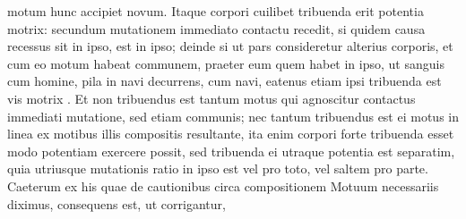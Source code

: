 %
motum hunc accipiet novum. 
\pend
%
\pstart
Itaque corpori cuilibet tribuenda erit potentia motrix\lbrack:\rbrack\protect{}
%
%
secundum mutationem
%
%
immediato contactu\protect{} recedit, si quidem causa recessus%
\protect{} sit in ipso,
%
%
est in ipso; deinde 
%
si ut pars consideretur alterius corporis, et cum eo motum habeat communem, praeter eum quem habet in ipso, 
%
ut sanguis\protect{} cum homine\protect{}, 
%
pila\protect{} in navi\protect{} decurrens,
%
cum navi\protect{}, 
%
eatenus etiam ipsi tribuenda est vis motrix%
\protect{}
%
. Et 
%
%
non tribuendus est tantum motus qui agnoscitur contactus immediati%
\protect{} mutatione, 
%
sed etiam communis; nec tantum tribuendus est ei motus in linea ex motibus illis compositis resultante, 
%
ita enim corpori forte tribuenda esset 
%
%
modo potentiam\protect{} exercere possit, sed tribuenda ei utraque 
%
potentia\protect{} est separatim, quia utriusque
%
 mutationis ratio in ipso est vel pro toto, vel saltem pro parte.
\pend
%
\pstart
Caeterum ex his
%
quae de cautionibus circa compositionem Motuum%
\protect{} necessariis diximus, consequens est, ut corrigantur, 
